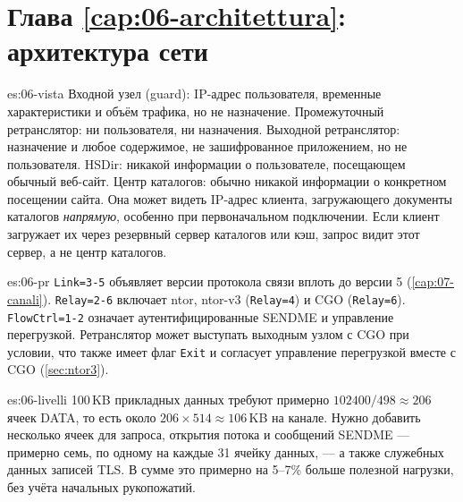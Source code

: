 \section*{Глава \ref{cap:06-architettura}: архитектура сети}

\begin{soluzione}{es:06-vista}
Входной узел (guard): IP-адрес пользователя, временные характеристики и объём трафика, но не назначение. Промежуточный ретранслятор: ни пользователя, ни назначения. Выходной ретранслятор: назначение и любое содержимое, не зашифрованное приложением, но не пользователя. HSDir: никакой информации о пользователе, посещающем обычный веб-сайт. Центр каталогов: обычно никакой информации о конкретном посещении сайта. Она может видеть IP-адрес клиента, загружающего документы каталогов \emph{напрямую}, особенно при первоначальном подключении. Если клиент загружает их через резервный сервер каталогов или кэш, запрос видит этот сервер, а не центр каталогов.
\end{soluzione}

\begin{soluzione}{es:06-pr}
\texttt{Link=3-5} объявляет версии протокола связи вплоть до версии 5 (\cref{cap:07-canali}). \texttt{Relay=2-6} включает ntor, ntor-v3 (\texttt{Relay=4}) и CGO (\texttt{Relay=6}). \texttt{FlowCtrl=1-2} означает аутентифицированные SENDME и управление перегрузкой. Ретранслятор может выступать выходным узлом с CGO при условии, что также имеет флаг \texttt{Exit} и согласует управление перегрузкой вместе с CGO (\cref{sec:ntor3}).
\end{soluzione}

\begin{soluzione}{es:06-livelli}
100\,KB прикладных данных требуют примерно $102400/498 \approx 206$ ячеек DATA, то есть около $206 \times 514 \approx 106$\,KB на канале. Нужно добавить несколько ячеек для запроса, открытия потока и сообщений SENDME — примерно семь, по одному на каждые 31 ячейку данных, — а также служебных данных записей TLS. В сумме это примерно на 5--7\% больше полезной нагрузки, без учёта начальных рукопожатий.
\end{soluzione}
